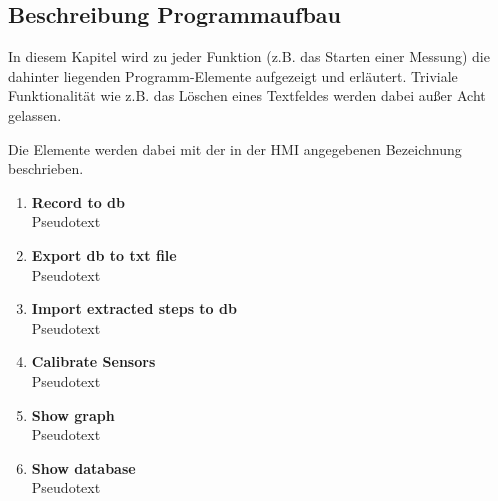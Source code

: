 \subsection{Beschreibung Programmaufbau}
\label{kap:ClientGraphCode}
In diesem Kapitel wird zu jeder Funktion (z.B. das Starten einer Messung) die dahinter liegenden Programm-Elemente aufgezeigt und erläutert. Triviale Funktionalität wie z.B. das Löschen eines Textfeldes werden dabei außer Acht gelassen.

Die Elemente werden dabei mit der in der HMI angegebenen Bezeichnung beschrieben.

\begin{enumerate}
	\item \textbf{Record to db}\\
	Pseudotext\\
	\item \textbf{Export db to txt file}\\
	Pseudotext\\
	\item \textbf{Import extracted steps to db}\\
	Pseudotext\\
	\item \textbf{Calibrate Sensors}\\
	Pseudotext\\
	\item \textbf{Show graph}\\
	Pseudotext\\
	\item \textbf{Show database}\\
	Pseudotext\\
\end{enumerate}

